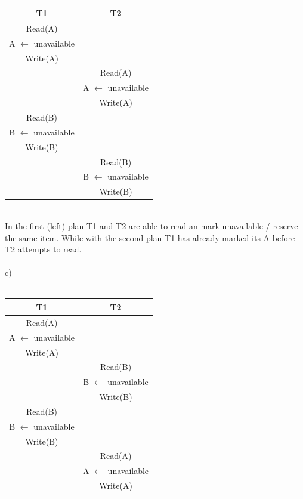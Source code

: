 \documentclass[12pt, letterpaper, twoside]{article}
\begin{document}
\ \ \ \
\begin{tabular}{ |c|c| }
 \hline
 T1 & T2\\ [0.5ex]
 \hline
 Read(A)&\\
 A $\leftarrow$ unavailable&\\
 Write(A)&\\
 
 &Read(A)\\
 &A $\leftarrow$ unavailable\\
 &Write(A)\\

 Read(B)&\\
 B $\leftarrow$ unavailable&\\
 Write(B)&\\ 
 
 &Read(B)\\
 &B $\leftarrow$ unavailable\\
 &Write(B)\\
 \hline
\end{tabular}\\
In the first (left) plan T1 and T2 are able to read an mark unavailable / reserve the same item.
While with the second plan T1 has already marked its A before T2 attempts to read.\\
\ \\
c)\\
\ \\
\begin{tabular}{ |c|c| }
 \hline
 T1 & T2\\ [0.5ex]
 \hline
 Read(A)&\\
 A $\leftarrow$ unavailable&\\
 Write(A)&\\
 
 &Read(B)\\
 &B $\leftarrow$ unavailable\\
 &Write(B)\\ 

 Read(B)&\\
 B $\leftarrow$ unavailable&\\
 Write(B)&\\ 

 &Read(A)\\
 &A $\leftarrow$ unavailable\\
 &Write(A)\\
 \hline
\end{tabular}
\ \ \ \
\end{document}
